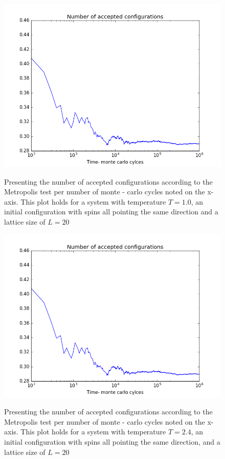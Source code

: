 \documentclass[12pt]{article}
\begin{document}
\begin{figure}[H]
\includegraphics[scale=0.6]{accept_config_ord_1.png}\label{fig:accept_config_1_ord}
\caption{Presenting the number of accepted configurations according to the Metropolis test per number of monte - carlo cycles noted on the x-axis. This plot holds for a system with temperature $T = 1.0$, an initial configuration with spins all pointing the same direction and a lattice size of $L = 20 $}
\end{figure}

\begin{figure}[H]
\includegraphics[scale=0.6]{accept_config_ord_2.png}\label{fig:accept_config_ord}
\caption{Presenting the number of accepted configurations according to the Metropolis test per number of monte - carlo cycles noted on the x-axis. This plot holds for a system with temperature $T = 2.4$, an initial configuration with spins all pointing the same direction, and a lattice size of $L = 20 $}
\end{figure}
\end{document}
